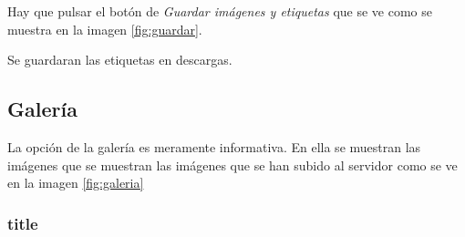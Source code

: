 Hay que pulsar el botón de \textit{Guardar imágenes y etiquetas} que se ve como se muestra en la imagen \ref{fig:guardar}.

Se guardaran las etiquetas en descargas.
\subsection{Galería}

La opción de la galería es meramente informativa. En ella se muestran las imágenes que se muestran las imágenes que se han subido al servidor como se ve en la imagen \ref{fig:galeria}
\subsubsection{title}